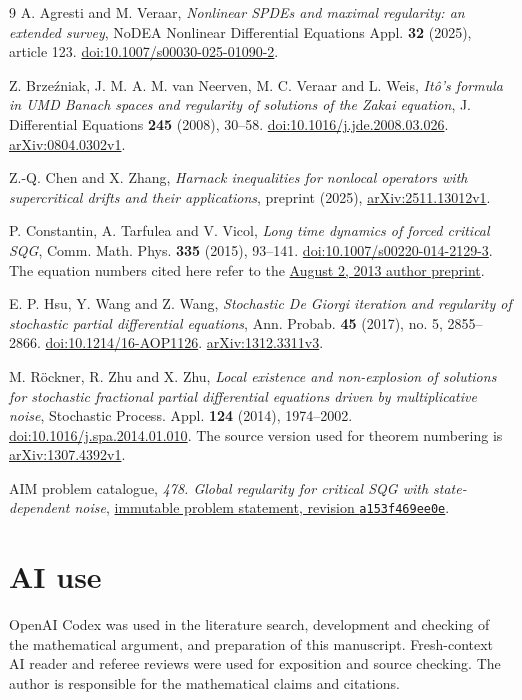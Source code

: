 \documentclass[11pt]{amsart}
\theoremstyle{remark}
\numberwithin{equation}{section}
\begin{document}
\begin{thebibliography}{9}
A. Agresti and M. Veraar,
\emph{Nonlinear SPDEs and maximal regularity: an extended survey},
NoDEA Nonlinear Differential Equations Appl. \textbf{32} (2025), article 123.
\href{https://doi.org/10.1007/s00030-025-01090-2}{doi:10.1007/s00030-025-01090-2}.

Z. Brze\'zniak, J. M. A. M. van Neerven, M. C. Veraar and L. Weis,
\emph{It\^o's formula in UMD Banach spaces and regularity of solutions of the Zakai equation},
J. Differential Equations \textbf{245} (2008), 30--58.
\href{https://doi.org/10.1016/j.jde.2008.03.026}{doi:10.1016/j.jde.2008.03.026}.
\href{https://arxiv.org/abs/0804.0302v1}{arXiv:0804.0302v1}.

Z.-Q. Chen and X. Zhang,
\emph{Harnack inequalities for nonlocal operators with supercritical drifts and their applications},
preprint (2025), \href{https://arxiv.org/abs/2511.13012v1}{arXiv:2511.13012v1}.

P. Constantin, A. Tarfulea and V. Vicol,
\emph{Long time dynamics of forced critical SQG},
Comm. Math. Phys. \textbf{335} (2015), 93--141.
\href{https://doi.org/10.1007/s00220-014-2129-3}{doi:10.1007/s00220-014-2129-3}.
The equation numbers cited here refer to the
\href{https://cims.nyu.edu/~vicol/CTV2.pdf}{August 2, 2013 author preprint}.

E. P. Hsu, Y. Wang and Z. Wang,
\emph{Stochastic De Giorgi iteration and regularity of stochastic partial differential equations},
Ann. Probab. \textbf{45} (2017), no. 5, 2855--2866.
\href{https://doi.org/10.1214/16-AOP1126}{doi:10.1214/16-AOP1126}.
\href{https://arxiv.org/abs/1312.3311v3}{arXiv:1312.3311v3}.

M. R\"ockner, R. Zhu and X. Zhu,
\emph{Local existence and non-explosion of solutions for stochastic fractional partial differential equations driven by multiplicative noise},
Stochastic Process. Appl. \textbf{124} (2014), 1974--2002.
\href{https://doi.org/10.1016/j.spa.2014.01.010}{doi:10.1016/j.spa.2014.01.010}.
The source version used for theorem numbering is
\href{https://arxiv.org/abs/1307.4392v1}{arXiv:1307.4392v1}.

AIM problem catalogue,
\emph{478. Global regularity for critical SQG with state-dependent noise},
\href{https://github.com/MColbrook/AIM/blob/a153f469ee0ea64e876b2ad97c79d252c19a3e22/problems/478-critical-stochastic-sqg-global-regularity.md}{immutable problem statement, revision \texttt{a153f469ee0e}}.
\end{thebibliography}

\section*{AI use}
OpenAI Codex was used in the literature search, development and checking of
the mathematical argument, and preparation of this manuscript. Fresh-context
AI reader and referee reviews were used for exposition and source checking.
The author is responsible for the mathematical claims and citations.
\end{document}
